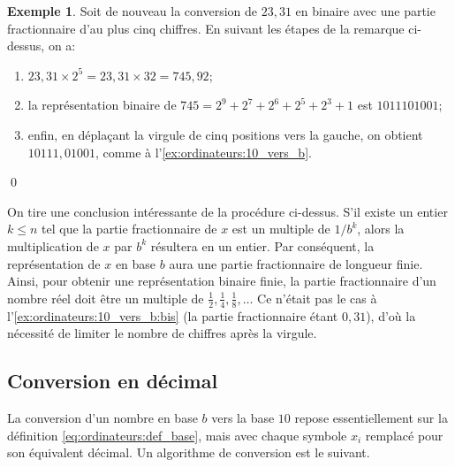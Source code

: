 \documentclass[letterpaper,11pt]{memoir}
\theoremstyle{plain}
\theoremstyle{definition}
\newtheorem{exemple}{Exemple}[chapter]
\theoremstyle{remark}
\begin{document}
\begin{exemple}
  \label{ex:ordinateurs:10_vers_b:bis}
  Soit de nouveau la conversion de $23,31$ en binaire avec une partie
  fractionnaire d'au plus cinq chiffres. En suivant les étapes de la
  remarque ci-dessus, on a:
  \begin{enumerate}
  \item $23,31 \times 2^5 = 23,31 \times 32 = 745,92$;
  \item la représentation binaire de $745 = 2^9 + 2^7 + 2^6 + 2^5 +
    2^3 + 1$ est $1011101001$;
  \item enfin, en déplaçant la virgule de cinq positions vers la
    gauche, on obtient $10111,01001$, comme à
    l'\autoref{ex:ordinateurs:10_vers_b}.
  \end{enumerate}
  \qed
\end{exemple}

On tire une conclusion intéressante de la procédure ci-dessus. S'il
existe un entier $k \leq n$ tel que la partie fractionnaire de $x$ est
un multiple de $1/b^k$, alors la multiplication de $x$ par $b^k$
résultera en un entier. Par conséquent, la représentation de $x$ en
base $b$ aura une partie fractionnaire de longueur finie. Ainsi, pour
obtenir une représentation binaire finie, la partie fractionnaire d'un
nombre réel doit être un multiple de $\frac{1}{2}, \frac{1}{4},
\frac{1}{8}, \dots$ Ce n'était pas le cas à
l'\autoref{ex:ordinateurs:10_vers_b:bis} (la partie fractionnaire
étant $0,31$), d'où la nécessité de limiter le nombre de chiffres
après la virgule.

\subsection{Conversion en décimal}
\label{sec:ordinateurs:conversion:b_vers_10}

La conversion d'un nombre en base $b$ vers la base $10$ repose
essentiellement sur la définition \eqref{eq:ordinateurs:def_base},
mais avec chaque symbole $x_i$ remplacé pour son équivalent décimal.
Un algorithme de conversion est le suivant.
\end{document}
